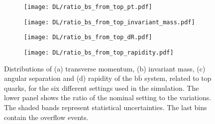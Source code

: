 \begin{figure}[H]
    \centering
    \begin{subfigure}{0.49\textwidth}
        \centering
        \texttt{[image: DL/ratio\_bs\_from\_top\_pt.pdf]}
        \caption{}
        \label{app:subfig:pt(bbbar)_DL}
    \end{subfigure}
    \begin{subfigure}{0.49\textwidth}
        \centering
        \texttt{[image: DL/ratio\_bs\_from\_top\_invariant\_mass.pdf]}
        \caption{}
        \label{app:subfig:m(bbbar)_DL}
    \end{subfigure}

    \vspace{0.2cm}
    
    \begin{subfigure}{0.49\textwidth}
        \centering
        \texttt{[image: DL/ratio\_bs\_from\_top\_dR.pdf]}
        \caption{}
        \label{app:subfig:dR(bbbar)_DL}
    \end{subfigure}
    \begin{subfigure}{0.49\textwidth}
        \centering
        \texttt{[image: DL/ratio\_bs\_from\_top\_rapidity.pdf]}
        \caption{}
        \label{app:subfig:y(bbbar)_DL}
    \end{subfigure}
    \caption{Distributions of (a) transverse momentum, (b) invariant mass,  (c) angular separation and (d) rapidity of the b$\overline{\text{b}}$ system, related to top quarks, for the six different settings used in the simulation. The lower panel shows the ratio of the nominal setting to the variations. The shaded bands represent statistical uncertainties. The last bins contain the overflow events.}
    \label{app:fig:bbbar_DL}
\end{figure}

